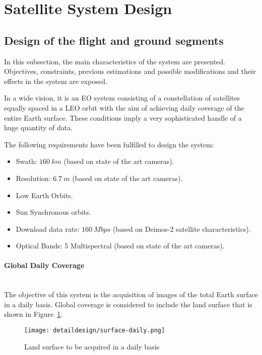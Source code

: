 
\section{Satellite System Design}
\label{subsec:system-design}
\subsection{Design of the flight and ground segments}
\label{subsubsec:design-flight-ground}
In this subsection, the main characteristics of the system are presented. Objectives, constraints, previous estimations and possible modifications and their effects in the system are exposed.

In a wide vision, it is an \ac{EO} system consisting of a constellation of satellites equally spaced in a \ac{LEO} orbit with the aim of achieving daily coverage of the entire Earth surface. These conditions imply a very sophisticated handle of a huge quantity of data.

The following requirements have been fulfilled to design the system:
\begin{itemize}
\item Swath: $160~km$ (based on state of the art cameras).
\item Resolution: $6.7~m$ (based on state of the art cameras).
\item Low Earth Orbits.
\item Sun Synchronous orbits.
\item Download data rate: $160~Mbps$ (based on Deimos-2 satellite characteristics).
\item Optical Bands: 5 Multispectral (based on state of the art cameras).
\end{itemize}

\paragraph{Global Daily Coverage}~\\
The objective of this system is the acquisition of images of the total Earth surface in a daily basis. Global coverage is considered to include the land surface that is shown in Figure~\ref{fig:intr-land-surface}.


\begin{figure}[!h]
\begin{center}
\texttt{[image: detaildesign/surface-daily.png]}
\caption{Land surface to be acquired in a daily basis}
\label{fig:intr-land-surface}
\end{center}
\end{figure}



